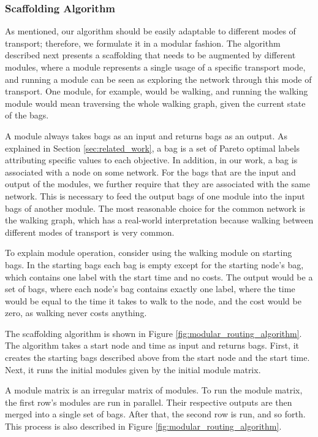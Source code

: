 \subsubsection{Scaffolding Algorithm}
\label{subsubsec:algorithm}

As mentioned, our algorithm should be easily adaptable to different modes of transport; therefore, we formulate it in a modular fashion.
The algorithm described next presents a scaffolding that needs to be augmented by different modules, where a module represents a single usage of a specific transport mode, and running a module can be seen as exploring the network through this mode of transport.
One module, for example, would be walking, and running the walking module would mean traversing the whole walking graph, given the current state of the bags.

A module always takes bags as an input and returns bags as an output.
As explained in Section \ref{sec:related_work}, a bag is a set of Pareto optimal labels attributing specific values to each objective.
In addition, in our work, a bag is associated with a node on some network.
For the bags that are the input and output of the modules, we further require that they are associated with the same network.
This is necessary to feed the output bags of one module into the input bags of another module.
The most reasonable choice for the common network is the walking graph, which has a real-world interpretation because walking between different modes of transport is very common.

To  explain module operation, consider using the walking module on starting bags.
In the starting bags each bag is empty except for the starting node's bag, which contains one label with the start time and no costs.
The output would be a set of bags, where each node's bag contains exactly one label, where the time would be equal to the time it takes to walk to the node, and the cost would be zero, as walking never costs anything.

The scaffolding algorithm is shown in Figure \ref{fig:modular_routing_algorithm}.
The algorithm takes a start node and time as input and returns bags.
First, it creates the starting bags described above from the start node and the start time.
Next, it runs the initial modules given by the initial module matrix.

A module matrix is an irregular matrix of modules.
To run the module matrix, the first row's modules are run in parallel.
Their respective outputs are then merged into a single set of bags.
After that, the second row is run, and so forth.
This process is also described in Figure \ref{fig:modular_routing_algorithm}.

